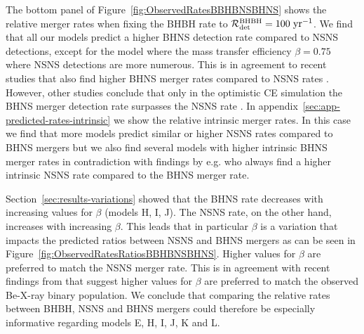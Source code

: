 \documentclass[twocolumn]{aastex63}
\newcommand\rate{\mathcal{R}}
\newcommand\bhnsSingle{BHNS\xspace}
\newcommand{\yearmin}{\ensuremath{\,\rm{yr}^{-1}}\xspace}
\begin{document}
The bottom panel  of Figure~\ref{fig:ObservedRatesBBHBNSBHNS} shows the relative merger rates when fixing the \ac{BHBH} rate to $\rate_{\rm{det}}^{\rm{BHBH}} = 100$\yearmin. We find that all our models predict a higher \bhnsSingle detection rate compared to \ac{NSNS} detections, except for the model where the mass transfer efficiency $\beta=0.75$ where \ac{NSNS} detections are more numerous.  This is in agreement to recent studies that also find higher \bhnsSingle merger rates compared to NSNS rates \citep{2019PhRvD.100f4060B}. However, other studies conclude that only in the optimistic CE simulation the \bhnsSingle merger detection rate surpasses the \ac{NSNS} rate  \citep{2015ApJ...806..263D}.
 In appendix~\ref{sec:app-predicted-rates-intrinsic} we show the relative intrinsic merger rates. In this case we find that more models predict similar or higher \ac{NSNS} rates compared to \bhnsSingle mergers but we also find several models with  higher intrinsic \bhnsSingle merger rates in contradiction with findings by e.g. \citet{2015ApJ...806..263D} who always find a higher intrinsic \ac{NSNS} rate compared to the \bhnsSingle merger rate.   %

Section~\ref{sec:results-variations} showed that the \bhnsSingle rate decreases with increasing values for $\beta$ (models H, I, J). The \ac{NSNS} rate, on the other hand,  increases with increasing $\beta$. This leads that in particular $\beta$ is a variation that impacts the predicted ratios between \ac{NSNS} and \bhnsSingle mergers as can be seen in Figure~\ref{fig:ObservedRatesRatiosBBHBNSBHNS}.  Higher values for $\beta$ are preferred to match the \ac{NSNS} merger rate.  This is in agreement with recent findings from  \citet{2020arXiv200300195V} that suggest higher values for $\beta$ are preferred to match the observed Be-X-ray binary population. 
We conclude that comparing the relative rates between BHBH, \ac{NSNS} and \bhnsSingle mergers could therefore be especially informative  regarding models E, H, I, J, K and L. 


\end{document}
